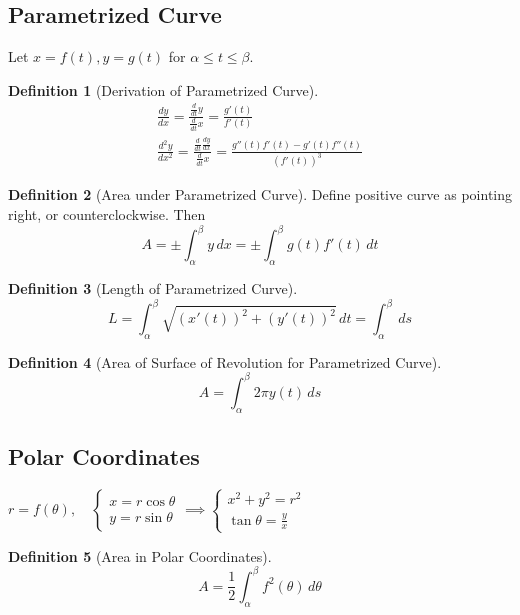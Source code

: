 \documentclass[11pt]{article}
\theoremstyle{definition}
\newtheorem{definition}{Definition}[section]
\theoremstyle{remark}
\begin{document}
\subsection{Parametrized Curve}
Let $x=f(t), y=g(t)$ for $\alpha \leq t \leq \beta$.
\begin{definition}[Derivation of Parametrized Curve]
\begin{align}
\frac{dy}{dx} = \frac{\frac{d}{dt}y}{\frac{d}{dt}x}=\frac{g'(t)}{f'(t)} \\
\frac{d^2y}{dx^2}=\frac{\frac{d}{dt}\frac{dy}{dx}}{\frac{d}{dt}x}=\frac{g''(t)f'(t)-g'(t)f''(t)}{(f'(t))^3}
\end{align}
\end{definition}

\begin{definition}[Area under Parametrized Curve] Define positive curve as pointing right, or counterclockwise. Then
\begin{equation}
A=\pm \int_\alpha^\beta y \, dx =\pm \int_\alpha^\beta g(t)f'(t) \, dt
\end{equation}
\end{definition}

\begin{definition}[Length of Parametrized Curve]\begin{equation}
L=\int_\alpha^\beta \sqrt{(x'(t))^2+(y'(t))^2} \, dt = \int_\alpha^\beta \, ds
\end{equation}
\end{definition}

\begin{definition}[Area of Surface of Revolution for Parametrized Curve] \begin{equation}
A=\int_\alpha^\beta 2\pi y(t)\, ds
\end{equation}
\end{definition}

\subsection{Polar Coordinates}
$r=f(\theta), \quad\begin{cases}
x=r\cos\theta \\ y=r\sin \theta
\end{cases} \implies \begin{cases}
x^2+y^2 = r^2 \\ \tan\theta = \frac{y}{x}
\end{cases}$

\begin{definition}[Area in Polar Coordinates]
\begin{equation}
A=\frac{1}{2}\int_\alpha^\beta f^2(\theta)\, d\theta
\end{equation}
\end{definition}
\end{document}
